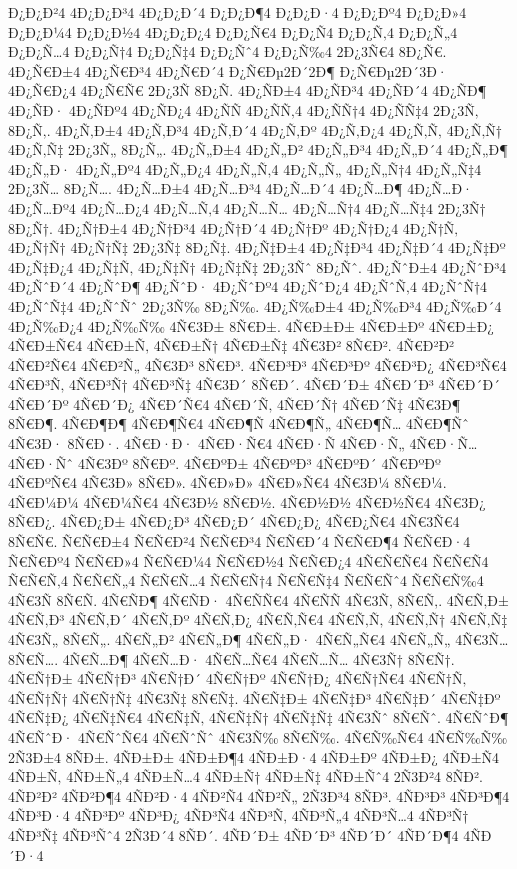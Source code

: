 {Ð¿Ð¿Ð²4
4Ð¿Ð¿Ð³4
4Ð¿Ð¿Ð´4
Ð¿Ð¿Ð¶4
Ð¿Ð¿Ð·4
Ð¿Ð¿Ðº4
Ð¿Ð¿Ð»4
Ð¿Ð¿Ð¼4
Ð¿Ð¿Ð½4
4Ð¿Ð¿Ð¿4
Ð¿Ð¿Ñ€4
Ð¿Ð¿Ñ4
Ð¿Ð¿Ñ‚4
Ð¿Ð¿Ñ„4
Ð¿Ð¿Ñ…4
Ð¿Ð¿Ñ†4
Ð¿Ð¿Ñ‡4
Ð¿Ð¿Ñˆ4
Ð¿Ð¿Ñ‰4
2Ð¿3Ñ€4
8Ð¿Ñ€.
4Ð¿Ñ€Ð±4
4Ð¿Ñ€Ð³4
4Ð¿Ñ€Ð´4
Ð¿Ñ€Ðµ2Ð´2Ð¶
Ð¿Ñ€Ðµ2Ð´3Ð·
4Ð¿Ñ€Ð¿4
4Ð¿Ñ€Ñ€
2Ð¿3Ñ
8Ð¿Ñ.
4Ð¿ÑÐ±4
4Ð¿ÑÐ³4
4Ð¿ÑÐ´4
4Ð¿ÑÐ¶
4Ð¿ÑÐ·
4Ð¿ÑÐº4
4Ð¿ÑÐ¿4
4Ð¿ÑÑ
4Ð¿ÑÑ‚4
4Ð¿ÑÑ†4
4Ð¿ÑÑ‡4
2Ð¿3Ñ‚
8Ð¿Ñ‚.
4Ð¿Ñ‚Ð±4
4Ð¿Ñ‚Ð³4
4Ð¿Ñ‚Ð´4
4Ð¿Ñ‚Ðº
4Ð¿Ñ‚Ð¿4
4Ð¿Ñ‚Ñ‚
4Ð¿Ñ‚Ñ†
4Ð¿Ñ‚Ñ‡
2Ð¿3Ñ„
8Ð¿Ñ„.
4Ð¿Ñ„Ð±4
4Ð¿Ñ„Ð²
4Ð¿Ñ„Ð³4
4Ð¿Ñ„Ð´4
4Ð¿Ñ„Ð¶
4Ð¿Ñ„Ð·
4Ð¿Ñ„Ðº4
4Ð¿Ñ„Ð¿4
4Ð¿Ñ„Ñ‚4
4Ð¿Ñ„Ñ„
4Ð¿Ñ„Ñ†4
4Ð¿Ñ„Ñ‡4
2Ð¿3Ñ…
8Ð¿Ñ….
4Ð¿Ñ…Ð±4
4Ð¿Ñ…Ð³4
4Ð¿Ñ…Ð´4
4Ð¿Ñ…Ð¶
4Ð¿Ñ…Ð·
4Ð¿Ñ…Ðº4
4Ð¿Ñ…Ð¿4
4Ð¿Ñ…Ñ‚4
4Ð¿Ñ…Ñ…
4Ð¿Ñ…Ñ†4
4Ð¿Ñ…Ñ‡4
2Ð¿3Ñ†
8Ð¿Ñ†.
4Ð¿Ñ†Ð±4
4Ð¿Ñ†Ð³4
4Ð¿Ñ†Ð´4
4Ð¿Ñ†Ðº
4Ð¿Ñ†Ð¿4
4Ð¿Ñ†Ñ‚
4Ð¿Ñ†Ñ†
4Ð¿Ñ†Ñ‡
2Ð¿3Ñ‡
8Ð¿Ñ‡.
4Ð¿Ñ‡Ð±4
4Ð¿Ñ‡Ð³4
4Ð¿Ñ‡Ð´4
4Ð¿Ñ‡Ðº
4Ð¿Ñ‡Ð¿4
4Ð¿Ñ‡Ñ‚
4Ð¿Ñ‡Ñ†
4Ð¿Ñ‡Ñ‡
2Ð¿3Ñˆ
8Ð¿Ñˆ.
4Ð¿ÑˆÐ±4
4Ð¿ÑˆÐ³4
4Ð¿ÑˆÐ´4
4Ð¿ÑˆÐ¶
4Ð¿ÑˆÐ·
4Ð¿ÑˆÐº4
4Ð¿ÑˆÐ¿4
4Ð¿ÑˆÑ‚4
4Ð¿ÑˆÑ†4
4Ð¿ÑˆÑ‡4
4Ð¿ÑˆÑˆ
2Ð¿3Ñ‰
8Ð¿Ñ‰.
4Ð¿Ñ‰Ð±4
4Ð¿Ñ‰Ð³4
4Ð¿Ñ‰Ð´4
4Ð¿Ñ‰Ð¿4
4Ð¿Ñ‰Ñ‰
4Ñ€3Ð±
8Ñ€Ð±.
4Ñ€Ð±Ð±
4Ñ€Ð±Ðº
4Ñ€Ð±Ð¿
4Ñ€Ð±Ñ€4
4Ñ€Ð±Ñ‚
4Ñ€Ð±Ñ†
4Ñ€Ð±Ñ‡
4Ñ€3Ð²
8Ñ€Ð².
4Ñ€Ð²Ð²
4Ñ€Ð²Ñ€4
4Ñ€Ð²Ñ„
4Ñ€3Ð³
8Ñ€Ð³.
4Ñ€Ð³Ð³
4Ñ€Ð³Ðº
4Ñ€Ð³Ð¿
4Ñ€Ð³Ñ€4
4Ñ€Ð³Ñ‚
4Ñ€Ð³Ñ†
4Ñ€Ð³Ñ‡
4Ñ€3Ð´
8Ñ€Ð´.
4Ñ€Ð´Ð±
4Ñ€Ð´Ð³
4Ñ€Ð´Ð´
4Ñ€Ð´Ðº
4Ñ€Ð´Ð¿
4Ñ€Ð´Ñ€4
4Ñ€Ð´Ñ‚
4Ñ€Ð´Ñ†
4Ñ€Ð´Ñ‡
4Ñ€3Ð¶
8Ñ€Ð¶.
4Ñ€Ð¶Ð¶
4Ñ€Ð¶Ñ€4
4Ñ€Ð¶Ñ
4Ñ€Ð¶Ñ„
4Ñ€Ð¶Ñ…
4Ñ€Ð¶Ñˆ
4Ñ€3Ð·
8Ñ€Ð·.
4Ñ€Ð·Ð·
4Ñ€Ð·Ñ€4
4Ñ€Ð·Ñ
4Ñ€Ð·Ñ„
4Ñ€Ð·Ñ…
4Ñ€Ð·Ñˆ
4Ñ€3Ðº
8Ñ€Ðº.
4Ñ€ÐºÐ±
4Ñ€ÐºÐ³
4Ñ€ÐºÐ´
4Ñ€ÐºÐº
4Ñ€ÐºÑ€4
4Ñ€3Ð»
8Ñ€Ð».
4Ñ€Ð»Ð»
4Ñ€Ð»Ñ€4
4Ñ€3Ð¼
8Ñ€Ð¼.
4Ñ€Ð¼Ð¼
4Ñ€Ð¼Ñ€4
4Ñ€3Ð½
8Ñ€Ð½.
4Ñ€Ð½Ð½
4Ñ€Ð½Ñ€4
4Ñ€3Ð¿
8Ñ€Ð¿.
4Ñ€Ð¿Ð±
4Ñ€Ð¿Ð³
4Ñ€Ð¿Ð´
4Ñ€Ð¿Ð¿
4Ñ€Ð¿Ñ€4
4Ñ€3Ñ€4
8Ñ€Ñ€.
Ñ€Ñ€Ð±4
Ñ€Ñ€Ð²4
Ñ€Ñ€Ð³4
Ñ€Ñ€Ð´4
Ñ€Ñ€Ð¶4
Ñ€Ñ€Ð·4
Ñ€Ñ€Ðº4
Ñ€Ñ€Ð»4
Ñ€Ñ€Ð¼4
Ñ€Ñ€Ð½4
Ñ€Ñ€Ð¿4
4Ñ€Ñ€Ñ€4
Ñ€Ñ€Ñ4
Ñ€Ñ€Ñ‚4
Ñ€Ñ€Ñ„4
Ñ€Ñ€Ñ…4
Ñ€Ñ€Ñ†4
Ñ€Ñ€Ñ‡4
Ñ€Ñ€Ñˆ4
Ñ€Ñ€Ñ‰4
4Ñ€3Ñ
8Ñ€Ñ.
4Ñ€ÑÐ¶
4Ñ€ÑÐ·
4Ñ€ÑÑ€4
4Ñ€ÑÑ
4Ñ€3Ñ‚
8Ñ€Ñ‚.
4Ñ€Ñ‚Ð±
4Ñ€Ñ‚Ð³
4Ñ€Ñ‚Ð´
4Ñ€Ñ‚Ðº
4Ñ€Ñ‚Ð¿
4Ñ€Ñ‚Ñ€4
4Ñ€Ñ‚Ñ‚
4Ñ€Ñ‚Ñ†
4Ñ€Ñ‚Ñ‡
4Ñ€3Ñ„
8Ñ€Ñ„.
4Ñ€Ñ„Ð²
4Ñ€Ñ„Ð¶
4Ñ€Ñ„Ð·
4Ñ€Ñ„Ñ€4
4Ñ€Ñ„Ñ„
4Ñ€3Ñ…
8Ñ€Ñ….
4Ñ€Ñ…Ð¶
4Ñ€Ñ…Ð·
4Ñ€Ñ…Ñ€4
4Ñ€Ñ…Ñ…
4Ñ€3Ñ†
8Ñ€Ñ†.
4Ñ€Ñ†Ð±
4Ñ€Ñ†Ð³
4Ñ€Ñ†Ð´
4Ñ€Ñ†Ðº
4Ñ€Ñ†Ð¿
4Ñ€Ñ†Ñ€4
4Ñ€Ñ†Ñ‚
4Ñ€Ñ†Ñ†
4Ñ€Ñ†Ñ‡
4Ñ€3Ñ‡
8Ñ€Ñ‡.
4Ñ€Ñ‡Ð±
4Ñ€Ñ‡Ð³
4Ñ€Ñ‡Ð´
4Ñ€Ñ‡Ðº
4Ñ€Ñ‡Ð¿
4Ñ€Ñ‡Ñ€4
4Ñ€Ñ‡Ñ‚
4Ñ€Ñ‡Ñ†
4Ñ€Ñ‡Ñ‡
4Ñ€3Ñˆ
8Ñ€Ñˆ.
4Ñ€ÑˆÐ¶
4Ñ€ÑˆÐ·
4Ñ€ÑˆÑ€4
4Ñ€ÑˆÑˆ
4Ñ€3Ñ‰
8Ñ€Ñ‰.
4Ñ€Ñ‰Ñ€4
4Ñ€Ñ‰Ñ‰
2Ñ3Ð±4
8ÑÐ±.
4ÑÐ±Ð±
4ÑÐ±Ð¶4
4ÑÐ±Ð·4
4ÑÐ±Ðº
4ÑÐ±Ð¿
4ÑÐ±Ñ4
4ÑÐ±Ñ‚
4ÑÐ±Ñ„4
4ÑÐ±Ñ…4
4ÑÐ±Ñ†
4ÑÐ±Ñ‡
4ÑÐ±Ñˆ4
2Ñ3Ð²4
8ÑÐ².
4ÑÐ²Ð²
4ÑÐ²Ð¶4
4ÑÐ²Ð·4
4ÑÐ²Ñ4
4ÑÐ²Ñ„
2Ñ3Ð³4
8ÑÐ³.
4ÑÐ³Ð³
4ÑÐ³Ð¶4
4ÑÐ³Ð·4
4ÑÐ³Ðº
4ÑÐ³Ð¿
4ÑÐ³Ñ4
4ÑÐ³Ñ‚
4ÑÐ³Ñ„4
4ÑÐ³Ñ…4
4ÑÐ³Ñ†
4ÑÐ³Ñ‡
4ÑÐ³Ñˆ4
2Ñ3Ð´4
8ÑÐ´.
4ÑÐ´Ð±
4ÑÐ´Ð³
4ÑÐ´Ð´
4ÑÐ´Ð¶4
4ÑÐ´Ð·4
}
